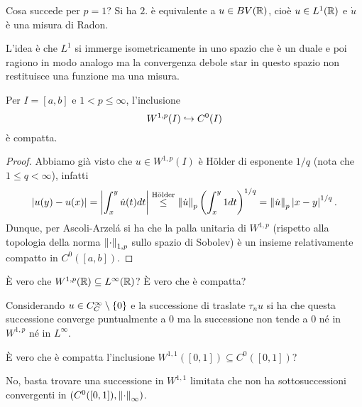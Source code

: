 \begin{remark}
Cosa succede per $p=1$? 
Si ha $2.$ \`e equivalente a $u\in BV(\mathbb{R})$, cio\`e $u\in L^1(\mathbb{R})$ e $\dot u$ \`e una misura di Radon.


L'idea \`e che $L^1$ si immerge isometricamente in uno spazio che \`e un duale e poi ragiono in modo analogo ma la convergenza debole star in questo spazio non restituisce una funzione ma una misura.
\end{remark}


\begin{exercise}
Per $I=[a,b]$ e $1<p\leq \infty$, l'inclusione 
\[W^{1,p}(I)\hookrightarrow C^0(I)\]
\`e compatta.
\end{exercise}
\begin{proof}
Abbiamo gi\`a visto che $u\in W^{1,p}(I)$ \`e H\"older di esponente $1/q$ (nota che $1\leq q<\infty$), infatti
\[\left|{u(y)-u(x)}\right|=\left|{\int_x^y\dot u(t)dt}\right|\overset{\text{H\"older}}\leq \left\Vert{\dot u}\right\Vert_p\left({\int_x^y 1dt}\right)^{1/q}=\left\Vert{\dot u}\right\Vert_p\left|{x-y}\right|^{1/q}.\]
Dunque, per Ascoli-Arzel\'a si ha che la palla unitaria di $W^{1,p}$ (rispetto alla topologia della norma ${\left\Vert{\cdot}\right\Vert}_{1,p}$ sullo spazio di Sobolev) \`e un insieme relativamente compatto in $C^0([a,b])$.
\end{proof}

\begin{remark}
\`E vero che $W^{1,p}(\mathbb{R})\subseteq L^\infty(\mathbb{R})$? \`E vero che \`e compatta?
\end{remark}
\begin{solution}
Considerando $u\in C^\infty_C\setminus\{0\}$ e la successione di traslate $\tau_nu$ si ha che questa successione converge puntualmente a $0$ ma la successione non tende a $0$ n\'e in $W^{1,p}$ n\'e in $L^\infty$.
\end{solution}

\begin{exercise}
\`E vero che \`e compatta l'inclusione $W^{1,1}([0,1])\subseteq C^0([0,1])$?
\end{exercise}
\begin{solution}
No, basta trovare una successione in $W^{1,1}$ limitata che non ha sottosuccessioni convergenti in $(C^0([0,1]),{\left\Vert{\cdot}\right\Vert}_\infty)$.
\end{solution}












